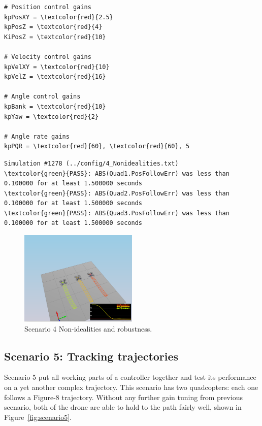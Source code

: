 \documentclass[a4paper]{article}
\begin{document}
\begin{Verbatim}[frame=single, commandchars=\\\{\}]
# Position control gains
kpPosXY = \textcolor{red}{2.5}
kpPosZ = \textcolor{red}{4}
KiPosZ = \textcolor{red}{10}

# Velocity control gains
kpVelXY = \textcolor{red}{10}
kpVelZ = \textcolor{red}{16}

# Angle control gains
kpBank = \textcolor{red}{10}
kpYaw = \textcolor{red}{2}

# Angle rate gains
kpPQR = \textcolor{red}{60}, \textcolor{red}{60}, 5
\end{Verbatim}

\begin{Verbatim}[frame=lines, label=Simulator Test Result Output, commandchars=\\\{\}]
Simulation #1278 (../config/4_Nonidealities.txt)
\textcolor{green}{PASS}: ABS(Quad1.PosFollowErr) was less than 0.100000 for at least 1.500000 seconds
\textcolor{green}{PASS}: ABS(Quad2.PosFollowErr) was less than 0.100000 for at least 1.500000 seconds
\textcolor{green}{PASS}: ABS(Quad3.PosFollowErr) was less than 0.100000 for at least 1.500000 seconds
\end{Verbatim}

\begin{figure}[ht]
\centering
\includegraphics[width=0.5\textwidth]{./fig/scenario4.png}
\caption{\label{fig:scenario4} Scenario 4 Non-idealities and robustness.}
\end{figure}

\subsection{Scenario 5: Tracking trajectories}

Scenario 5 put all working parts of a controller together and test its performance on a yet another complex trajectory. This scenario has two quadcopters: each one follows a Figure-8 trajectory. Without any further gain tuning from previous scenario, both of the drone are able to hold to the path fairly well, shown in Figure~\ref{fig:scenario5}.
\end{document}
